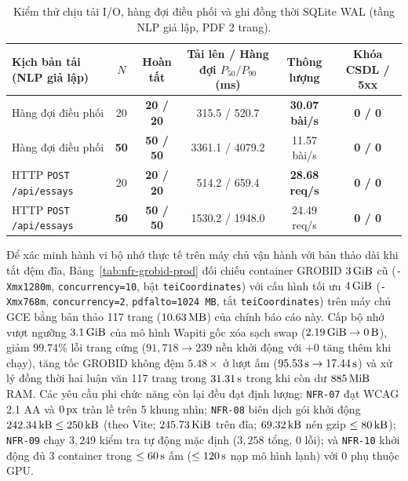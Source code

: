 {\setlength{\tabcolsep}{3pt}
\begin{table}[!htbp]
\centering
\caption{Kiểm thử chịu tải I/O, hàng đợi điều phối và ghi đồng thời SQLite WAL (tầng NLP giả lập, PDF 2 trang).}\label{tab:nfr-deadline-stress}
\begin{tabular}{|L{0.23}|C{0.07}|C{0.15}|C{0.21}|C{0.19}|C{0.15}|}
\hline
\textbf{Kịch bản tải (NLP giả lập)} & \textbf{$N$} & \textbf{Hoàn tất} & \textbf{Tải lên / Hàng đợi $P_{50}/P_{90}$ (ms)} & \textbf{Thông lượng} & \textbf{Khóa CSDL / 5xx} \\
\hline
Hàng đợi điều phối & 20 & \textbf{20 / 20} & 315.5 / 520.7 & \textbf{30.07 bài/s} & \textbf{0 / 0} \\
\hline
Hàng đợi điều phối & \textbf{50} & \textbf{50 / 50} & 3361.1 / 4079.2 & 11.57 bài/s & \textbf{0 / 0} \\
\hline
HTTP \texttt{POST /\allowbreak api/\allowbreak essays} & 20 & \textbf{20 / 20} & 514.2 / 659.4 & \textbf{28.68 req/s} & \textbf{0 / 0} \\
\hline
HTTP \texttt{POST /\allowbreak api/\allowbreak essays} & \textbf{50} & \textbf{50 / 50} & 1530.2 / 1948.0 & 24.49 req/s & \textbf{0 / 0} \\
\hline
\end{tabular}
\end{table}
}

Để xác minh hành vi bộ nhớ thực tế trên máy chủ vận hành với bản thảo dài khi tắt đệm đĩa, Bảng~\ref{tab:nfr-grobid-prod} đối chiếu container GROBID $3\text{\,GiB}$ cũ (\texttt{-Xmx1280m}, \texttt{concurrency=10}, bật \texttt{teiCoordinates}) với cấu hình tối ưu $4\text{\,GiB}$ (\texttt{-Xmx768m}, \texttt{concurrency=2}, \texttt{pdfalto=1024\,MB}, tắt \texttt{teiCoordinates}) trên máy chủ GCE bằng bản thảo 117 trang ($10.63\text{\,MB}$) của chính báo cáo này. Cấp bộ nhớ vượt ngưỡng $3.1\text{\,GiB}$ của mô hình Wapiti gốc xóa sạch swap ($2.19\text{\,GiB} \rightarrow 0\text{\,B}$), giảm $99.74\%$ lỗi trang cứng ($91{,}718 \rightarrow 239$ nền khởi động với $+0$ tăng thêm khi chạy), tăng tốc GROBID không đệm $5.48\times$ ở lượt ấm ($95.53\text{\,s} \rightarrow 17.44\text{\,s}$) và xử lý đồng thời hai luận văn 117 trang trong $31.31\text{\,s}$ trong khi còn dư $885\text{\,MiB}$ RAM. Các yêu cầu phi chức năng còn lại đều đạt định lượng: \texttt{NFR-07} đạt WCAG 2.1 AA và $0\text{\,px}$ tràn lề trên 5 khung nhìn; \texttt{NFR-08} biên dịch gói khởi động $242.34\text{\,kB} \le 250\text{\,kB}$ (theo Vite; $245.73\text{\,KiB}$ trên đĩa; $69.32\text{\,kB}$ nén gzip $\le 80\text{\,kB}$); \texttt{NFR-09} chạy $3{,}249$ kiểm tra tự động mặc định ($3{,}258$ tổng, $0$ lỗi); và \texttt{NFR-10} khởi động đủ 3 container trong $\le 60\text{\,s}$ ấm ($\le 120\text{\,s}$ nạp mô hình lạnh) với $0$ phụ thuộc GPU.

